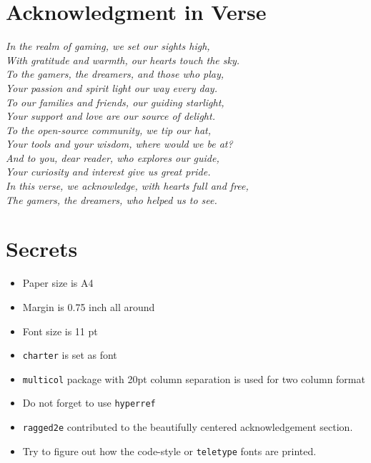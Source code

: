 \documentclass[11pt,a4paper]{article}
\begin{document}
	\section{Acknowledgment in Verse}
	\begin{center}
			\itshape
			In the realm of gaming, we set our sights high, \\
			With gratitude and warmth, our hearts touch the sky. \\
			
			To the gamers, the dreamers, and those who play, \\
			Your passion and spirit light our way every day. \\
			
			To our families and friends, our guiding starlight, \\
			Your support and love are our source of delight. \\
			
			To the open-source community, we tip our hat, \\
			Your tools and your wisdom, where would we be at? \\
			
			And to you, dear reader, who explores our guide, \\
			Your curiosity and interest give us great pride. \\
			
			In this verse, we acknowledge, with hearts full and free, \\
			The gamers, the dreamers, who helped us to see.

	\end{center}
	
	\section{Secrets}
	\begin{itemize}
		\item Paper size is A4
		\item Margin is 0.75 inch all around
		\item Font size is 11 pt
		\item \texttt{charter} is set as font
		\item \texttt{multicol} package with 20pt column separation is used for two column format
		\item Do not forget to use \texttt{hyperref}
		\item \texttt{ragged2e} contributed to the beautifully centered acknowledgement section.
		\item Try to figure out how the code-style or \texttt{teletype} fonts are printed.
	\end{itemize}
\end{document}

